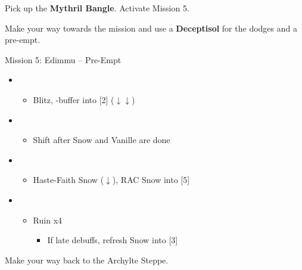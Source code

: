 Pick up the \textbf{Mythril Bangle}.
Activate Mission 5.

Make your way towards the mission and use a \textbf{Deceptisol} for the dodges and a pre-empt.

\begin{battle}{Mission 5: Edimmu -- Pre-Empt}
	\begin{itemize}
		\item \sixth
			\begin{itemize}
				\item Blitz, \rav-buffer into [2] ($\downarrow\downarrow$)
			\end{itemize}
		\item \second
			\begin{itemize}
				\item Shift after Snow and Vanille are done
			\end{itemize}
		\item \fourth
			\begin{itemize}
				\item Haste-Faith Snow ($\downarrow$), RAC Snow into [5]
			\end{itemize}
		\item \fifth
			\begin{itemize}
				\item Ruin x4
					\begin{itemize}
						\item If late debuffs, refresh Snow into [3]
					\end{itemize}
			\end{itemize}
	\end{itemize}
\end{battle}

Make your way back to the Archylte Steppe.
\newpage